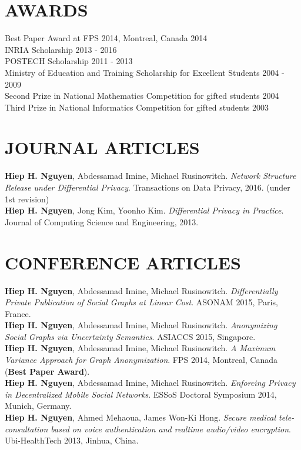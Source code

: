 \documentclass[margin, 10pt]{res} %
\begin{document}
\begin{resume}
 
\section{AWARDS}
Best Paper Award at FPS 2014, Montreal, Canada											\hfill 2014 \\
INRIA Scholarship																		\hfill 2013 - 2016 \\
POSTECH Scholarship																		\hfill 2011 - 2013 \\
Ministry of Education and Training Scholarship for Excellent Students 					\hfill 2004 - 2009 \\
Second Prize in National Mathematics Competition for gifted students					\hfill 2004 \\
Third Prize in National Informatics Competition for gifted students						\hfill 2003 


\section{JOURNAL ARTICLES}
\textbf{Hiep H. Nguyen}, Abdessamad Imine, Michael Rusinowitch. \textit{Network Structure Release under Differential Privacy}. Transactions on Data Privacy, 2016. (under 1st revision) \\
\textbf{Hiep H. Nguyen}, Jong Kim, Yoonho Kim. \textit{Differential Privacy in Practice}. Journal of Computing Science and Engineering, 2013.

\section{CONFERENCE ARTICLES}
\textbf{Hiep H. Nguyen}, Abdessamad Imine, Michael Rusinowitch. \textit{Differentially Private Publication of Social Graphs at Linear Cost}. ASONAM 2015, Paris, France. \\
\textbf{Hiep H. Nguyen}, Abdessamad Imine, Michael Rusinowitch. \textit{Anonymizing Social Graphs via Uncertainty Semantics}. ASIACCS 2015, Singapore. \\
\textbf{Hiep H. Nguyen}, Abdessamad Imine, Michael Rusinowitch. \textit{A Maximum Variance Approach for Graph Anonymization}. FPS 2014, Montreal, Canada (\textbf{Best Paper Award}). \\
\textbf{Hiep H. Nguyen}, Abdessamad Imine, Michael Rusinowitch. \textit{Enforcing Privacy in Decentralized Mobile Social Networks}. ESSoS Doctoral Symposium 2014, Munich, Germany. \\
\textbf{Hiep H. Nguyen}, Ahmed Mehaoua, James Won-Ki Hong. \textit{Secure medical tele-consultation based on voice authentication and realtime audio/video encryption}. Ubi-HealthTech 2013, Jinhua, China.


\end{resume}
\end{document}
